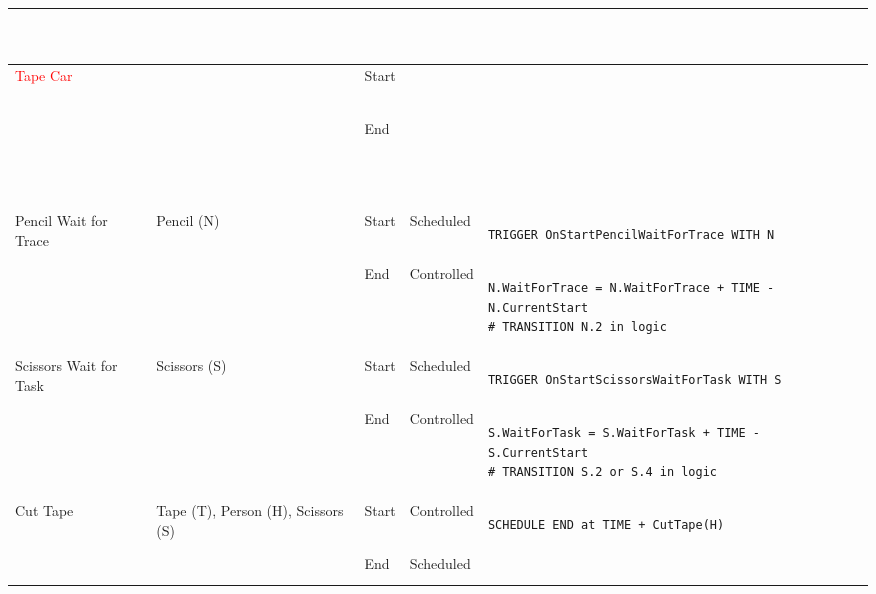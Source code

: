 \begin{longtable}{@{}>{\raggedright\arraybackslash}p{1.8cm}>{\raggedright\arraybackslash}p{2.1cm}>{\raggedright\arraybackslash}p{0.9cm}>{\raggedright\arraybackslash}p{2.2cm}>{\raggedright\arraybackslash}p{8.75cm}@{}}
\begin{lstlisting}[language=CMPseudo]
 
\end{lstlisting}             \\ \midrule
  \textcolor{Red}{Tape Car}                  &  & Start &   & 
\begin{lstlisting}[language=CMPseudo]
 
\end{lstlisting}             \\
  &                                                          & End   &  &
\begin{lstlisting}[language=CMPseudo]
 
 
 
\end{lstlisting}              \\ \midrule
  Pencil Wait for Trace    & Pencil (N)                             & Start & Scheduled  & 
\begin{lstlisting}[language=CMPseudo]
TRIGGER OnStartPencilWaitForTrace WITH N
\end{lstlisting}             \\
  &                                                          & End   & Controlled & 
\begin{lstlisting}[language=CMPseudo]
N.WaitForTrace = N.WaitForTrace + TIME - N.CurrentStart
# TRANSITION N.2 in logic
\end{lstlisting}             \\ \midrule
  Scissors Wait for Task    & Scissors (S)                            & Start & Scheduled  & 
\begin{lstlisting}[language=CMPseudo]
TRIGGER OnStartScissorsWaitForTask WITH S
\end{lstlisting}             \\
  &                                                          & End   & Controlled & 
\begin{lstlisting}[language=CMPseudo]
S.WaitForTask = S.WaitForTask + TIME - S.CurrentStart
# TRANSITION S.2 or S.4 in logic
\end{lstlisting}             \\ \midrule
  Cut Tape                  & Tape (T), Person (H), Scissors (S)      & Start & Controlled  & 
\begin{lstlisting}[language=CMPseudo]
SCHEDULE END at TIME + CutTape(H)
\end{lstlisting}             \\
  &                                                          & End   & Scheduled & 
\begin{lstlisting}[language=CMPseudo]

\end{lstlisting}
\end{longtable}
